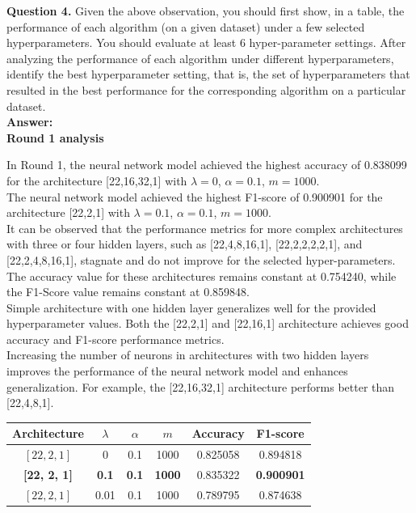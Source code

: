 \documentclass{article}
\begin{document}
\begin{enumerate}
\vspace{0.3cm}

\noindent \textbf{Question 4.} Given the above observation, you should first show, in a table, the performance of each algorithm (on a given dataset) under a few selected hyperparameters. You should evaluate at least 6 hyper-parameter settings. After analyzing the performance of each algorithm under different hyperparameters, identify the best hyperparameter setting, that is, the set of hyperparameters that resulted in the best performance for the corresponding algorithm on a particular dataset.\\

\noindent \textbf{Answer:}\\

\textbf{Round 1 analysis}

In Round 1, the neural network model achieved the highest accuracy of 0.838099 for the architecture [22,16,32,1] with $\lambda = 0$, $\alpha = 0.1$, $m = 1000$. \\

The neural network model achieved the highest F1-score of 0.900901 for the architecture [22,2,1] with $\lambda = 0.1$, $\alpha = 0.1$, $m = 1000$.\\

It can be observed that the performance metrics for more complex architectures with three or four hidden layers, such as [22,4,8,16,1], [22,2,2,2,2,1], and [22,2,4,8,16,1], stagnate and do not improve for the selected hyper-parameters. The accuracy value for these architectures remains constant at 0.754240, while the F1-Score value remains constant at 0.859848.\\

Simple architecture with one hidden layer generalizes well for the provided hyperparameter values. Both the [22,2,1] and [22,16,1] architecture achieves good accuracy and F1-score performance metrics.\\

Increasing the number of neurons in architectures with two hidden layers improves the performance of the neural network model and enhances generalization. For example, the [22,16,32,1] architecture performs better than [22,4,8,1].


\begin{table}[H]
\centering
\large
\renewcommand{\arraystretch}{1.3}
\setlength{\tabcolsep}{8pt}


\begin{tabular}{|c|c|c|c|c|c|}
\hline
\textbf{Architecture} & \textbf{$\lambda$} & \textbf{$\alpha$} & \textbf{$m$} & \textbf{Accuracy} & \textbf{F1-score} \\
\hline
$[22, 2, 1]$ & 0    & 0.1 & 1000 & 0.825058 & 0.894818 \\ \hline
\textbf{[22, 2, 1]} & \textbf{0.1}  & \textbf{0.1} & \textbf{1000} & 0.835322 & \textbf{0.900901} \\ \hline
$[22, 2, 1]$ & 0.01 & 0.1 & 1000 & 0.789795 & 0.874638 \\ \hline


\end{tabular}
\end{table}
\end{enumerate}
\end{document}
